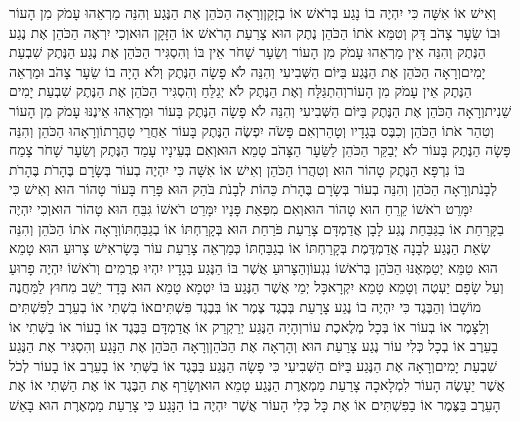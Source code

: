 \documentclass[../main/main.tex]{subfiles}
\begin{document}
\begin{multicols*}{\ncols}
וְאִישׁ אוֹ אִשָּׁה כִּי יִהְיֶה בוֹ נָגַע בְּרֹאשׁ אוֹ בְזָקָן\PreVerseSpace{}וְרָאָה הַכֹּהֵן אֶת הַנֶּגַע וְהִנֵּה מַרְאֵהוּ עָמֹק מִן הָעוֹר וּבוֹ שֵׂעָר צָהֹב דָּק וְטִמֵּא אֹתוֹ הַכֹּהֵן נֶתֶק הוּא צָרַעַת הָרֹאשׁ אוֹ הַזָּקָן הוּא\PreVerseSpace{}וְכִי יִרְאֶה הַכֹּהֵן אֶת נֶגַע הַנֶּתֶק וְהִנֵּה אֵין מַרְאֵהוּ עָמֹק מִן הָעוֹר וְשֵׂעָר שָׁחֹר אֵין בּוֹ וְהִסְגִּיר הַכֹּהֵן אֶת נֶגַע הַנֶּתֶק שִׁבְעַת יָמִים\PreVerseSpace{}וְרָאָה הַכֹּהֵן אֶת הַנֶּגַע בַּיּוֹם הַשְּׁבִיעִי וְהִנֵּה לֹא פָשָׂה הַנֶּתֶק וְלֹא הָיָה בוֹ שֵׂעָר צָהֹב וּמַרְאֵה הַנֶּתֶק אֵין עָמֹק מִן הָעוֹר\PreVerseSpace{}וְהִתְגַּלָּח וְאֶת הַנֶּתֶק לֹא יְגַלֵּחַ וְהִסְגִּיר הַכֹּהֵן אֶת הַנֶּתֶק שִׁבְעַת יָמִים שֵׁנִית\PreVerseSpace{}וְרָאָה הַכֹּהֵן אֶת הַנֶּתֶק בַּיּוֹם הַשְּׁבִיעִי וְהִנֵּה לֹא פָשָׂה הַנֶּתֶק בָּעוֹר וּמַרְאֵהוּ אֵינֶנּוּ עָמֹק מִן הָעוֹר וְטִהַר אֹתוֹ הַכֹּהֵן וְכִבֶּס בְּגָדָיו וְטָהֵר\PreVerseSpace{}וְאִם פָּשֹׂה יִפְשֶׂה הַנֶּתֶק בָּעוֹר אַחֲרֵי טָהֳרָתוֹ\PreVerseSpace{}וְרָאָהוּ הַכֹּהֵן וְהִנֵּה פָּשָׂה הַנֶּתֶק בָּעוֹר לֹא יְבַקֵּר הַכֹּהֵן לַשֵּׂעָר הַצָּהֹב טָמֵא הוּא\PreVerseSpace{}וְאִם בְּעֵינָיו עָמַד הַנֶּתֶק וְשֵׂעָר שָׁחֹר צָמַח בּוֹ נִרְפָּא הַנֶּתֶק טָהוֹר הוּא וְטִהֲרוֹ הַכֹּהֵן \ClosedSection{}וְאִישׁ אוֹ אִשָּׁה כִּי יִהְיֶה בְעוֹר בְּשָׂרָם בֶּהָרֹת בֶּהָרֹת לְבָנֹת\PreVerseSpace{}וְרָאָה הַכֹּהֵן וְהִנֵּה בְעוֹר בְּשָׂרָם בֶּהָרֹת כֵּהוֹת לְבָנֹת בֹּהַק הוּא פָּרַח בָּעוֹר טָהוֹר הוּא \ClosedSection{}וְאִישׁ כִּי יִמָּרֵט רֹאשׁוֹ קֵרֵחַ הוּא טָהוֹר הוּא\PreVerseSpace{}וְאִם מִפְּאַת פָּנָיו יִמָּרֵט רֹאשׁוֹ גִּבֵּחַ הוּא טָהוֹר הוּא\PreVerseSpace{}וְכִי יִהְיֶה בַקָּרַחַת אוֹ בַגַּבַּחַת נֶגַע לָבָן אֲדַמְדָּם צָרַעַת פֹּרַחַת הוּא בְּקָרַחְתּוֹ אוֹ בְגַבַּחְתּוֹ\PreVerseSpace{}וְרָאָה אֹתוֹ הַכֹּהֵן וְהִנֵּה שְׂאֵת הַנֶּגַע לְבָנָה אֲדַמְדֶּמֶת בְּקָרַחְתּוֹ אוֹ בְגַבַּחְתּוֹ כְּמַרְאֵה צָרַעַת עוֹר בָּשָׂר\PreVerseSpace{}אִישׁ צָרוּעַ הוּא טָמֵא הוּא טַמֵּא יְטַמְּאֶנּוּ הַכֹּהֵן בְּרֹאשׁוֹ נִגְעוֹ\PreVerseSpace{}וְהַצָּרוּעַ אֲשֶׁר בּוֹ הַנֶּגַע בְּגָדָיו יִהְיוּ פְרֻמִים וְרֹאשׁוֹ יִהְיֶה פָרוּעַ וְעַל שָׂפָם יַעְטֶה וְטָמֵא טָמֵא יִקְרָא\PreVerseSpace{}כָּל יְמֵי אֲשֶׁר הַנֶּגַע בּוֹ יִטְמָא טָמֵא הוּא בָּדָד יֵשֵׁב מִחוּץ לַמַּחֲנֶה מוֹשָׁבוֹ \ClosedSection{}וְהַבֶּגֶד כִּי יִהְיֶה בוֹ נֶגַע צָרָעַת בְּבֶגֶד צֶמֶר אוֹ בְּבֶגֶד פִּשְׁתִּים\PreVerseSpace{}אוֹ בִשְׁתִי אוֹ בְעֵרֶב לַפִּשְׁתִּים וְלַצָּמֶר אוֹ בְעוֹר אוֹ בְּכָל מְלֶאכֶת עוֹר\PreVerseSpace{}וְהָיָה הַנֶּגַע יְרַקְרַק אוֹ אֲדַמְדָּם בַּבֶּגֶד אוֹ בָעוֹר אוֹ בַשְּׁתִי אוֹ בָעֵרֶב אוֹ בְכָל כְּלִי עוֹר נֶגַע צָרַעַת הוּא וְהָרְאָה אֶת הַכֹּהֵן\PreVerseSpace{}וְרָאָה הַכֹּהֵן אֶת הַנָּגַע וְהִסְגִּיר אֶת הַנֶּגַע שִׁבְעַת יָמִים\PreVerseSpace{}וְרָאָה אֶת הַנֶּגַע בַּיּוֹם הַשְּׁבִיעִי כִּי פָשָׂה הַנֶּגַע בַּבֶּגֶד אוֹ בַשְּׁתִי אוֹ בָעֵרֶב אוֹ בָעוֹר לְכֹל אֲשֶׁר יֵעָשֶׂה הָעוֹר לִמְלָאכָה צָרַעַת מַמְאֶרֶת הַנֶּגַע טָמֵא הוּא\PreVerseSpace{}וְשָׂרַף אֶת הַבֶּגֶד אוֹ אֶת הַשְּׁתִי אוֹ אֶת הָעֵרֶב בַּצֶּמֶר אוֹ בַפִּשְׁתִּים אוֹ אֶת כָּל כְּלִי הָעוֹר אֲשֶׁר יִהְיֶה בוֹ הַנָּגַע כִּי צָרַעַת מַמְאֶרֶת הוּא בָּאֵשׁ 
\end{multicols*}
\end{document}
